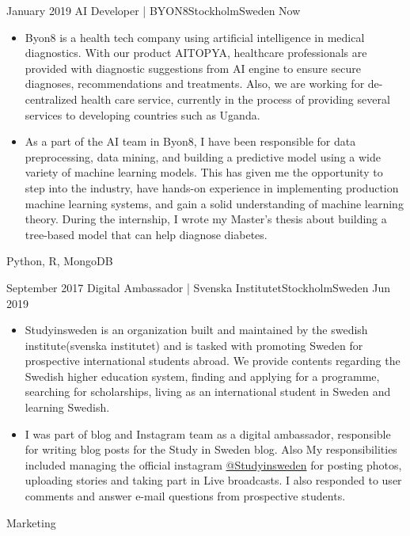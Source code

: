 %
%
%
\begin{experiences}
  \experience
    {January 2019} {AI Developer | BYON8}{Stockholm}{Sweden}
    {Now}    {\begin{itemize}
               \item Byon8 is a health tech company using artificial intelligence in medical diagnostics. With our product AITOPYA, healthcare professionals are provided with diagnostic suggestions from AI engine to ensure secure diagnoses, recommendations and treatments. Also, we are working for de-centralized health care service, currently in the process of providing several services to developing countries such as Uganda.
               \item As a part of the AI team in Byon8, I have been responsible for data preprocessing, data mining, and building a predictive model using a wide variety of machine learning models. This has given me the opportunity to step into the industry, have hands-on experience in implementing production machine learning systems, and gain a solid understanding of machine learning theory. During the internship, I wrote my Master's thesis about building a tree-based model that can help diagnose diabetes.
               \end{itemize}}
            {Python, R, MongoDB}
  \emptySeparator
  
  
   \experience
    {September 2017} {Digital Ambassador | Svenska Institutet}{Stockholm}{Sweden}
    {Jun 2019}    {\begin{itemize}
               \item Studyinsweden is an organization built and maintained by the swedish institute(svenska institutet) and is tasked with promoting Sweden for prospective international students abroad. We provide contents regarding the Swedish higher education system, finding and applying for a programme, searching for scholarships, living as an international student in Sweden and learning Swedish.
               \item I was part of blog and Instagram team as a digital ambassador, responsible for writing blog posts for the Study in Sweden blog. Also My responsibilities included managing the official instagram   \href{https://www.instagram.com/studyinsweden/}{@Studyinsweden} for posting photos, uploading stories and taking part in Live broadcasts. I also responded to user comments and answer e-mail questions from prospective students.
               \end{itemize}}
            {Marketing}
  \emptySeparator
  

\end{experiences}
